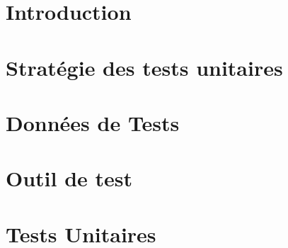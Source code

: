 \documentclass[asi]{picInsa}
\title{\PTU{}}
\author{\Michel} %
\begin{document}
\couverture{}

 \informationsGenerales{}


\tableofcontents

\setcounter{chapter}{0}

\chapter*{Introduction}
\label{introduction}


\chapter{Stratégie des tests unitaires}
\label{strategieDeTest}


\chapter{Données de Tests}
\label{donneesDeTests}


\chapter{Outil de test}
\label{outilDeTest}


\chapter{Tests Unitaires}
\label{testsUnitaires}


\pageQuatriemeCouverture
\end{document}
